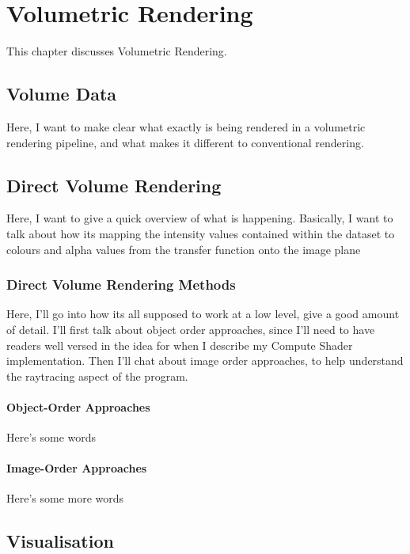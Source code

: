 \chapter{Volumetric Rendering}

This chapter discusses Volumetric Rendering. 

\section{Volume Data}

Here, I want to make clear what exactly is being rendered in a volumetric rendering pipeline, and what makes it different to conventional rendering.

\section{Direct Volume Rendering}

Here, I want to give a quick overview of what is happening. Basically, I want to talk about how its mapping the intensity values contained within the dataset to colours and alpha values from the transfer function onto the image plane

\subsection{Direct Volume Rendering Methods}

Here, I'll go into how its all supposed to work at a low level, give a good amount of detail. I'll first talk about object order approaches, since I'll need to have readers well versed in the idea for when I describe my Compute Shader implementation. Then I'll chat about image order approaches, to help understand the raytracing aspect of the program.
\subsubsection{Object-Order Approaches}

Here's some words

\subsubsection{Image-Order Approaches}

Here's some more words

\section{Visualisation}

